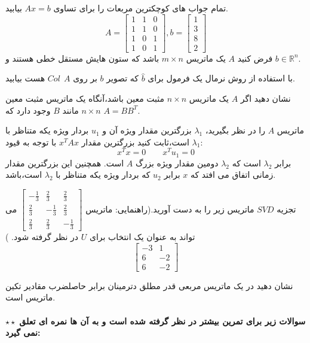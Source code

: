 \documentclass{article}
\begin{document}
 
 تمام جواب های کوچکترین مربعات را برای تساوی 
$Ax=b$
بیابید.
$$A= \begin{bmatrix}
1&1&0\\
1&1&0\\
1&0&1\\
1&0&1
\end{bmatrix},
b=\begin{bmatrix}
1\\
3\\
8\\
2
\end{bmatrix}
$$
فرض کنید 
$A$
یک ماتریس 
$m\times n$
باشد که ستون هایش مستقل خطی هستند و
 $b\in \mathbb{R}^n$.
 
 با استفاده  از
 روش نرمال یک فرمول برای 
$\hat{b}$
که تصویر 
$b$
بر روی 
$Col \ \ A$
هست بیابید.

نشان دهید اگر 
$A$
یک ماتریس
$n\times n$
مثبت معین باشد،آنگاه یک ماتریس مثبت معین 
$n\times n$
مانند 
$B$
وجود دارد که 
$A=BB^T$.


 ماتریس 
$A$
  را در نظر بگیرید،
$\lambda_1$
بزرگترین مقدار ویژه آن و
$u_1$
بردار ویژه یکه متناظر با 
$\lambda_1$
است،ثابت کنید بزرگترین مقدار 
$x^TAx$
با توجه به قیود:
$$x^Tx=0\qquad x^Tu_1=0$$
 برابر 
 $\lambda_2$
 است که 
 $\lambda_2$
 دومین مقدار ویژه بزرگ 
 $A$
 است. همچنین این بزرگترین مقدار زمانی اتفاق می افتد که 
 $x$
 برابر 
 $u_2$
 که بردار ویژه یکه متناظر با 
 $\lambda_2$
 است،باشد.

 تجزیه 
$SVD$
ماتریس زیر را به دست آورید.(راهنمایی:
ماتریس
$\begin{bmatrix}
-\frac{1}{3}&\frac{2}{3}&\frac{2}{3}\\
\frac{2}{3}&-\frac{1}{3}&\frac{2}{3}\\
\frac{2}{3}&\frac{2}{3}&-\frac{1}{3}
\end{bmatrix}$
می تواند به عنوان یک انتخاب برای 
$U$
در نظر گرفته شود.
)
  $$\begin{bmatrix}
  -3&1\\
  6&-2\\
  6&-2
  
  \end{bmatrix}$$
 
  نشان دهید در یک ماتریس مربعی قدر مطلق دترمینان برابر حاصلضرب مقادیر تکین ماتریس است. 
 \\
 \\
 $\star \star$
{\bf  سوالات زیر برای تمرین بیشتر در نظر گرفته شده است و به آن ها نمره ای تعلق نمی گیرد:}
 
\end{document}
